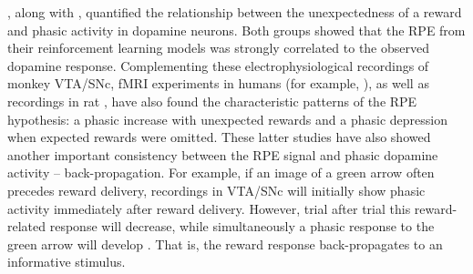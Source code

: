 \documentclass[doc]{apa}        %
\begin{document}
, along with , quantified the relationship between the unexpectedness of a reward and phasic activity in dopamine neurons.  Both groups showed that the RPE from their reinforcement learning models was strongly correlated to the observed dopamine response.  Complementing these electrophysiological recordings of monkey VTA/SNc, fMRI experiments in humans (for example, ), as well as recordings in rat \cite{Roesch:2007p2519}, have also found the characteristic patterns of the RPE hypothesis: a phasic increase with unexpected rewards and a phasic depression when expected rewards were omitted.  These latter studies have also showed another important consistency between the RPE signal and phasic dopamine activity -- back-propagation.  For example, if an image of a green arrow often precedes reward delivery, recordings in VTA/SNc will initially show phasic activity immediately after reward delivery.  However, trial after trial this reward-related response will decrease, while simultaneously a phasic response to the green arrow will develop \cite{Roesch:2007p2519}.  That is, the reward response back-propagates to an informative stimulus.   
\end{document}
